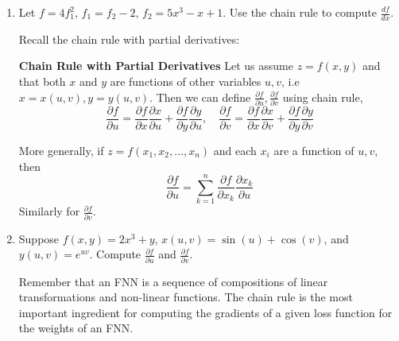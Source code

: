 \documentclass[12pt]{amsart}
\theoremstyle{definition}
\begin{document}
\vspace{.5em}
\begin{enumerate}[itemsep=2.5em,leftmargin=0pt]

\item Let $f = 4f_1^2$, $f_1=f_2-2$, $f_2 = 5x^3 - x + 1$. Use the chain rule to compute $\frac{df}{dx}$.

\vspace{2.5em}

\noindent Recall the chain rule with partial derivatives:\vspace{.5em}

\noindent \textbf{Chain Rule with Partial Derivatives} Let us assume $z= f(x,y)$ and that both $x$ and $y$ are functions of other variables $u, v$, i.e $x= x(u,v), y= y(u,v)$. Then we can define $\frac{\partial f}{\partial u}, \frac{\partial f}{\partial v}$ using chain rule,
        $$\frac{\partial f}{\partial u} = \frac{\partial f}{\partial x} \frac{\partial x}{\partial u}+ \frac{\partial f}{\partial y} \frac{\partial y}{\partial u}, \quad  \frac{\partial f}{\partial v} = \frac{\partial f}{\partial x} \frac{\partial x}{\partial v}+ \frac{\partial f}{\partial y} \frac{\partial y}{\partial v}$$

\noindent More generally, if $z=f(x_1,x_2,\ldots,x_n)$ and each $x_i$ are a function of $u, v$, then 
    $$ \frac{\partial f}{\partial u} = \sum_{k=1}^n \frac{\partial f}{\partial x_k} \frac{\partial x_k}{\partial u}$$
Similarly for $\frac{\partial f}{\partial v}$.

\vspace{-1.5em}

\item Suppose $f(x,y) = 2x^3 + y$, $x(u,v)=\sin(u)+\cos(v)$, and $y(u,v)=e^{uv}$. Compute $\frac{\partial f}{\partial u}$ and $\frac{\partial f}{\partial v}$.

\vspace{2.5em}

\noindent Remember that an FNN is a sequence of compositions of linear transformations and non-linear functions. The chain rule is the most important ingredient for computing the gradients of a given loss function for the weights of an FNN. \\


\end{enumerate}
\end{document}
